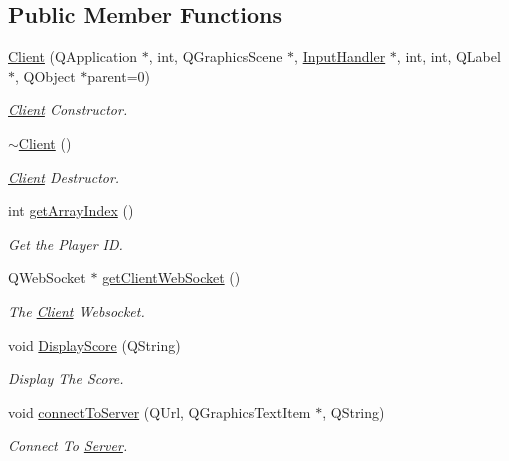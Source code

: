 \subsection*{Public Member Functions}
\begin{DoxyCompactItemize}
\item 
\hyperlink{classClient_a78171ef219443f177e1b7d80d0798d55}{Client} (Q\-Application $\ast$, int, Q\-Graphics\-Scene $\ast$, \hyperlink{classInputHandler}{Input\-Handler} $\ast$, int, int, Q\-Label $\ast$, Q\-Object $\ast$parent=0)
\begin{DoxyCompactList}\small\item\em \hyperlink{classClient}{Client} Constructor. \end{DoxyCompactList}\item 
\hypertarget{classClient_a840e519ca781888cbd54181572ebe3a7}{\hyperlink{classClient_a840e519ca781888cbd54181572ebe3a7}{$\sim$\-Client} ()}\label{classClient_a840e519ca781888cbd54181572ebe3a7}

\begin{DoxyCompactList}\small\item\em \hyperlink{classClient}{Client} Destructor. \end{DoxyCompactList}\item 
int \hyperlink{classClient_ad8fcb654942cf5d804010be882164d67}{get\-Array\-Index} ()
\begin{DoxyCompactList}\small\item\em Get the Player I\-D. \end{DoxyCompactList}\item 
Q\-Web\-Socket $\ast$ \hyperlink{classClient_a865e84b80885b731dfee9752e98485a8}{get\-Client\-Web\-Socket} ()
\begin{DoxyCompactList}\small\item\em The \hyperlink{classClient}{Client} Websocket. \end{DoxyCompactList}\item 
\hypertarget{classClient_a1b60e473f218c0910448adbef2cf644b}{void \hyperlink{classClient_a1b60e473f218c0910448adbef2cf644b}{Display\-Score} (Q\-String)}\label{classClient_a1b60e473f218c0910448adbef2cf644b}

\begin{DoxyCompactList}\small\item\em Display The Score. \end{DoxyCompactList}\item 
\hypertarget{classClient_af015d89a945001f35a8e8c3bb0459d4a}{void \hyperlink{classClient_af015d89a945001f35a8e8c3bb0459d4a}{connect\-To\-Server} (Q\-Url, Q\-Graphics\-Text\-Item $\ast$, Q\-String)}\label{classClient_af015d89a945001f35a8e8c3bb0459d4a}

\begin{DoxyCompactList}\small\item\em Connect To \hyperlink{classServer}{Server}. \end{DoxyCompactList}\end{DoxyCompactItemize}
